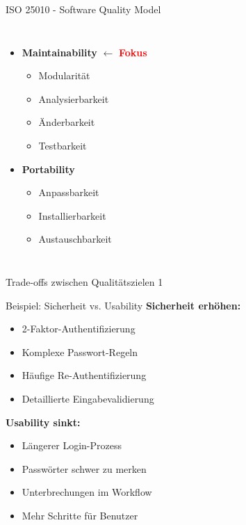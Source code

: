 \begin{frame}{ISO 25010 - Software Quality Model}
\begin{columns}[T]
    \begin{itemize}
      \item \textbf{Maintainability} $\leftarrow$ \textcolor{red}{\textbf{Fokus}}
        \begin{itemize}
          \item Modularität
          \item Analysierbarkeit
          \item Änderbarkeit
          \item Testbarkeit
        \end{itemize}
      \item \textbf{Portability}
        \begin{itemize}
          \item Anpassbarkeit
          \item Installierbarkeit
          \item Austauschbarkeit
        \end{itemize}
    \end{itemize}
  \end{columns}
\end{frame}

\begin{frame}{Trade-offs zwischen Qualitätszielen 1}
  \begin{exampleblock}{Beispiel: Sicherheit vs. Usability}
    \textbf{Sicherheit erhöhen:}
    \begin{itemize}
      \item 2-Faktor-Authentifizierung
      \item Komplexe Passwort-Regeln
      \item Häufige Re-Authentifizierung
      \item Detaillierte Eingabevalidierung
    \end{itemize}

    \textbf{Usability sinkt:}
    \begin{itemize}
      \item Längerer Login-Prozess
      \item Passwörter schwer zu merken
      \item Unterbrechungen im Workflow
      \item Mehr Schritte für Benutzer
    \end{itemize}
  \end{exampleblock}
\end{frame}

